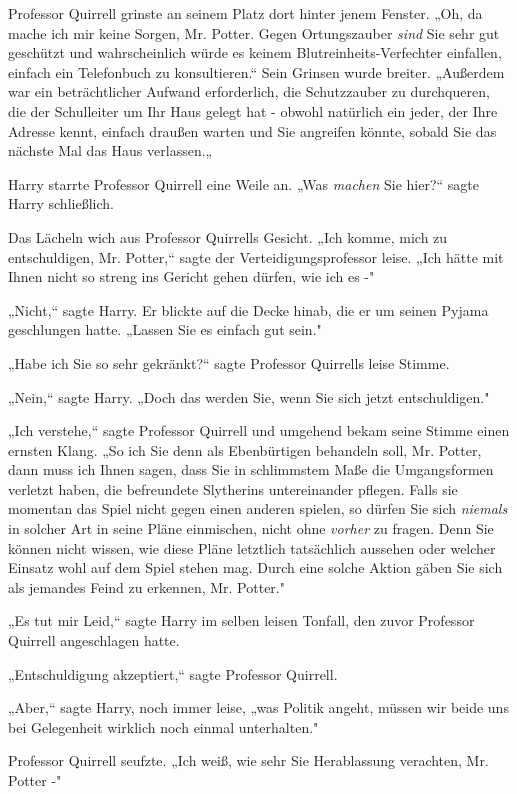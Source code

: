 {Professor Quirrell grinste an seinem Platz dort hinter jenem Fenster. „Oh, da mache ich mir keine Sorgen, Mr. Potter. Gegen Ortungszauber \emph{sind} Sie sehr gut geschützt und wahrscheinlich würde es keinem Blutreinheits-Verfechter einfallen, einfach ein Telefonbuch zu konsultieren.“ Sein Grinsen wurde breiter. „Außerdem war ein beträchtlicher Aufwand erforderlich, die Schutzzauber zu durchqueren, die der Schulleiter um Ihr Haus gelegt hat - obwohl natürlich ein jeder, der Ihre Adresse kennt, einfach draußen warten und Sie angreifen könnte, sobald Sie das nächste Mal das Haus verlassen.„

Harry starrte Professor Quirrell eine Weile an. „Was \emph{machen} Sie hier?“ sagte Harry schließlich.

Das Lächeln wich aus Professor Quirrells Gesicht. „Ich komme, mich zu entschuldigen, Mr. Potter,“ sagte der Verteidigungsprofessor leise. „Ich hätte mit Ihnen nicht so streng ins Gericht gehen dürfen, wie ich es -"

„Nicht,“ sagte Harry. Er blickte auf die Decke hinab, die er um seinen Pyjama geschlungen hatte. „Lassen Sie es einfach gut sein."

„Habe ich Sie so sehr gekränkt?“ sagte Professor Quirrells leise Stimme.

„Nein,“ sagte Harry. „Doch das werden Sie, wenn Sie sich jetzt entschuldigen."

„Ich verstehe,“ sagte Professor Quirrell und umgehend bekam seine Stimme einen ernsten Klang. „So ich Sie denn als Ebenbürtigen behandeln soll, Mr. Potter, dann muss ich Ihnen sagen, dass Sie in schlimmstem Maße die Umgangsformen verletzt haben, die befreundete Slytherins untereinander pflegen. Falls sie momentan das Spiel nicht gegen einen anderen spielen, so dürfen Sie sich \emph{niemals} in solcher Art in seine Pläne einmischen, nicht ohne \emph{vorher} zu fragen. Denn Sie können nicht wissen, wie diese Pläne letztlich tatsächlich aussehen oder welcher Einsatz wohl auf dem Spiel stehen mag. Durch eine solche Aktion gäben Sie sich als jemandes Feind zu erkennen, Mr. Potter."

„Es tut mir Leid,“ sagte Harry im selben leisen Tonfall, den zuvor Professor Quirrell angeschlagen hatte.

„Entschuldigung akzeptiert,“ sagte Professor Quirrell.

„Aber,“ sagte Harry, noch immer leise, „was Politik angeht, müssen wir beide uns bei Gelegenheit wirklich noch einmal unterhalten."

Professor Quirrell seufzte. „Ich weiß, wie sehr Sie Herablassung verachten, Mr. Potter -"

}
